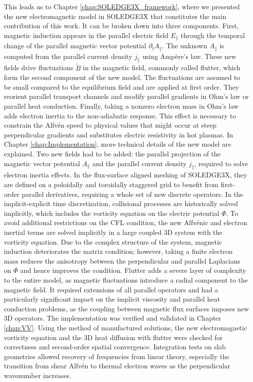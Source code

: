 This leads us to Chapter \ref{chap:SOLEDGE3X_framework}, where we presented the new electromagnetic model in SOLEDGE3X that constitutes the main contribution of this work. It can be broken down into three components. First, magnetic induction appears in the parallel electric field $E_\parallel$ through the temporal change of the parallel magnetic vector potential $\partial_t A_\parallel$. The unknown $A_\parallel$ is computed from the parallel current density $j_\parallel$ using Ampère's law. These new fields drive fluctuations $\tilde{B}$ in the magnetic field, commonly called flutter, which form the second component of the new model. The fluctuations are assumed to be small compared to the equilibrium field and are applied at first order. They reorient parallel transport channels and modify parallel gradients in Ohm's law or parallel heat conduction. Finally, taking a nonzero electron mass in Ohm's law adds electron inertia to the non-adiabatic response. This effect is necessary to constrain the Alfvén speed to physical values that might occur at steep perpendicular gradients and substitutes electric resistivity in hot plasmas. In Chapter \ref{chap:Implementation}, more technical details of the new model are explained. Two new fields had to be added: the parallel projection of the magnetic vector potential $A_\parallel$ and the parallel current density $j_\parallel$, required to solve electron inertia effects. In the flux-surface aligned meshing of SOLEDGE3X, they are defined on a poloidally and toroidally staggered grid to benefit from first-order parallel derivatives, requiring a whole set of new discrete operators. In the implicit-explicit time discretization, collisional processes are historically solved implicitly, which includes the vorticity equation on the electric potential $\Phi$. To avoid additional restrictions on the CFL condition, the new Alfvénic and electron inertial terms are solved implicitly in a large coupled 3D system with the vorticity equation. Due to the complex structure of the system, magnetic induction deteriorates the matrix condition; however, taking a finite electron mass reduces the anisotropy between the perpendicular and parallel Laplacians on $\Phi$ and hence improves the condition. Flutter adds a severe layer of complexity to the entire model, as magnetic fluctuations introduce a radial component to the magnetic field. It required extensions of all parallel operators and had a particularly significant impact on the implicit viscosity and parallel heat conduction problems, as the coupling between magnetic flux surfaces imposes new 3D operators. The implementation was verified and validated in Chapter \ref{chap:VV}. Using the method of manufactured solutions, the new electromagnetic vorticity equation and the 3D heat diffusion with flutter were checked for correctness and second-order spatial convergence. Integration tests on slab geometries allowed recovery of frequencies from linear theory, especially the transition from shear Alfvén to thermal electron waves as the perpendicular wavenumber increases. \\

